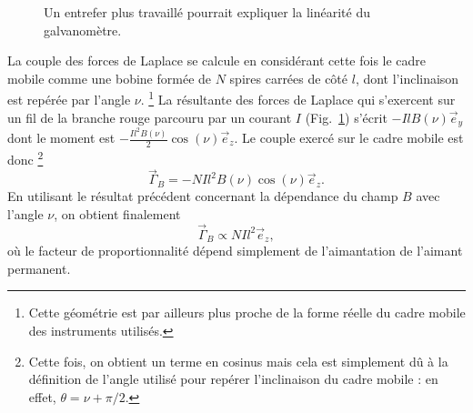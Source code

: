 \documentclass[12pt,a4paper,fleqn]{article}
\newcommand{\ey}{\vec{e}_y}
\newcommand{\ez}{\vec{e}_z}
\begin{document}
\begin{figure}
\center
{}
\caption{Un entrefer plus travaillé pourrait expliquer la linéarité du galvanomètre.}
\label{fig:entrefer_cyl}
\end{figure}

La couple des forces de Laplace se calcule en considérant cette fois le cadre mobile comme une bobine formée de $N$ spires carrées de côté $l$, dont l'inclinaison est repérée par l'angle $\nu$. 
\footnote{Cette géométrie est par ailleurs plus proche de la forme réelle du cadre mobile des instruments utilisés.}
La résultante des forces de Laplace qui s'exercent sur un fil de la branche rouge parcouru par un courant $I$ (Fig.~\ref{fig:entrefer_cyl}) s'écrit $-IlB(\nu)\ey$ dont le moment est $-\frac{Il^2B(\nu)}{2}\cos(\nu)\ez$.
Le couple exercé sur le cadre mobile est donc
\footnote{Cette fois, on obtient un terme en cosinus mais cela est simplement dû à la définition de l'angle utilisé pour repérer l'inclinaison du cadre mobile : en effet, $\theta = \nu + \pi/2$.}
\begin{equation}
\vec{\Gamma}_B = -NIl^2B(\nu)\cos(\nu)\ez.
\end{equation}
En utilisant le résultat précédent concernant la dépendance du champ $B$ avec l'angle $\nu$, on obtient finalement
\begin{equation}
\vec{\Gamma}_B \propto NIl^2 \ez,
\end{equation}
où le facteur de proportionnalité dépend simplement de l'aimantation de l'aimant permanent.
\end{document}

